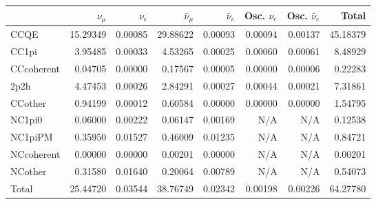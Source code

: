 \begin{tabular} { | l ||r | r | r | r | r | r | | r | }
\hline
              & $\nu_\mu$            & $\nu_e$              & $\bar{\nu}_{\mu}$    & $\bar{\nu}_{e}$      & Osc. $\nu_e$         & Osc. $\bar{\nu}_{e}$ & Total                \\ \hline\hline
 CCQE         & 15.29349             & 0.00085              & 29.88622             & 0.00093              & 0.00094              & 0.00137              & 45.18379             \\ \hline
 CC1pi        & 3.95485              & 0.00033              & 4.53265              & 0.00025              & 0.00060              & 0.00061              & 8.48929              \\ \hline
 CCcoherent   & 0.04705              & 0.00000              & 0.17567              & 0.00005              & 0.00000              & 0.00006              & 0.22283              \\ \hline
 2p2h         & 4.47453              & 0.00026              & 2.84291              & 0.00027              & 0.00044              & 0.00021              & 7.31861              \\ \hline
 CCother      & 0.94199              & 0.00012              & 0.60584              & 0.00000              & 0.00000              & 0.00000              & 1.54795              \\ \hline
 NC1pi0       & 0.06000              & 0.00222              & 0.06147              & 0.00169              & N/A                  & N/A                  & 0.12538              \\ \hline
 NC1piPM      & 0.35950              & 0.01527              & 0.46009              & 0.01235              & N/A                  & N/A                  & 0.84721              \\ \hline
 NCcoherent   & 0.00000              & 0.00000              & 0.00201              & 0.00000              & N/A                  & N/A                  & 0.00201              \\ \hline
 NCother      & 0.31580              & 0.01640              & 0.20064              & 0.00789              & N/A                  & N/A                  & 0.54073              \\ \hline
\hline
 Total        & 25.44720             & 0.03544              & 38.76749             & 0.02342              & 0.00198              & 0.00226              & 64.27780             \\ \hline

\end{tabular}
